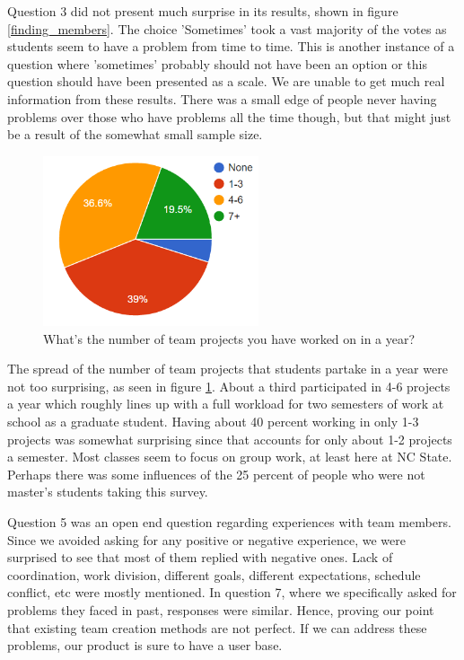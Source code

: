 \documentclass[conference]{IEEEtran}
\begin{document}
Question 3 did not present much surprise in its results, shown in figure \ref{finding_members}. The choice 'Sometimes'
took a vast majority of the votes as students seem to have a problem from time to time. This is another instance
of a question where 'sometimes' probably should not have been an option or this question should have been presented
as a scale. We are unable to get much real information from these results. There was a small edge of people never
having problems over those who have problems all the time though, but that might just be a result of the somewhat
small sample size. 

\begin{figure}[!ht]
\centering
\includegraphics[width=2.5in]{num_team_projects}
\caption{What's the number of team projects you have worked on in a year?}
\label{num_team_projects}
\end{figure}

The spread of the number of team projects that students partake in a year were not too surprising, as seen in figure
\ref{num_team_projects}. About a third participated in 4-6 projects a year which roughly lines up with a full workload
for two semesters of work at school as a graduate student. Having about 40 percent working in only 1-3 projects was somewhat surprising since
that accounts for only about 1-2 projects a semester. Most classes seem to focus on group work, at least here at NC State. 
Perhaps there was some influences of the 25 percent of people who were not master's students taking this survey.

Question 5 was an open end question regarding experiences with team members. Since we avoided asking for any positive or negative experience, we were surprised to see that most of them replied with negative ones. Lack of coordination, work division, different goals, different expectations, schedule conflict, etc were mostly mentioned. In question 7, where we specifically asked for problems they faced in past, responses were similar. Hence, proving our point that existing team creation methods are not perfect. If we can address these problems, our product is sure to have a user base.
\end{document}
